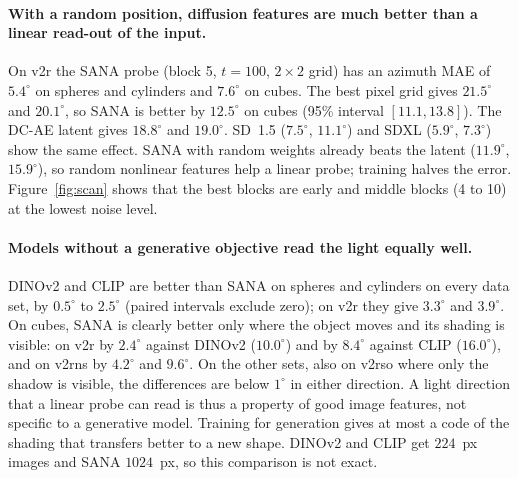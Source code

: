 \documentclass[10pt]{article}
\newcommand{\degr}{^\circ}
\begin{document}
\begin{table}[t]
\centering
\caption{Azimuth MAE (degrees, 95\% interval) of the probe selected on the validation split. Test: spheres and cylinders; cubes: a shape that the probe did not see. Last column: paired difference to the best pixel grid on the cubes. Block names of the UNets follow the order down, mid, up; DINOv2 and CLIP get no noise ($t=0$).}
\label{tab:rq1}
\resizebox{\linewidth}{!}{}
\end{table}

\paragraph{With a random position, diffusion features are much better than a linear read-out of the input.}
On v2r the SANA probe (block 5, $t=100$, $2\times2$ grid) has an azimuth MAE of $5.4\degr$ on spheres and cylinders and $7.6\degr$ on cubes.
The best pixel grid gives $21.5\degr$ and $20.1\degr$, so SANA is better by $12.5\degr$ on cubes (95\% interval $[11.1, 13.8]$).
The DC-AE latent gives $18.8\degr$ and $19.0\degr$.
SD~1.5 ($7.5\degr$, $11.1\degr$) and SDXL ($5.9\degr$, $7.3\degr$) show the same effect.
SANA with random weights already beats the latent ($11.9\degr$, $15.9\degr$), so random nonlinear features help a linear probe; training halves the error.
Figure~\ref{fig:scan} shows that the best blocks are early and middle blocks (4 to 10) at the lowest noise level.

\paragraph{Models without a generative objective read the light equally well.}
DINOv2 and CLIP are better than SANA on spheres and cylinders on every data set, by $0.5\degr$ to $2.5\degr$ (paired intervals exclude zero); on v2r they give $3.3\degr$ and $3.9\degr$.
On cubes, SANA is clearly better only where the object moves and its shading is visible: on v2r by $2.4\degr$ against DINOv2 ($10.0\degr$) and by $8.4\degr$ against CLIP ($16.0\degr$), and on v2rns by $4.2\degr$ and $9.6\degr$.
On the other sets, also on v2rso where only the shadow is visible, the differences are below $1\degr$ in either direction.
A light direction that a linear probe can read is thus a property of good image features, not specific to a generative model.
Training for generation gives at most a code of the shading that transfers better to a new shape.
DINOv2 and CLIP get $224$~px images and SANA $1024$~px, so this comparison is not exact.
\end{document}
